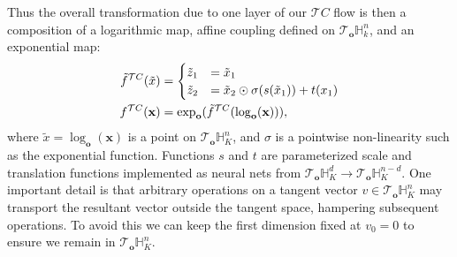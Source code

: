 Thus the overall transformation due to one layer of our $\mathcal{T}C$ flow is then a composition of a logarithmic map, affine coupling defined on $\mathcal{T}_{\textbf{o}}\mathbb{H}^n_k$, and an exponential map:
\begin{align}
    \label{eq:tangent_coupling}
     \tilde{f}^{\mathcal{T}C}(\tilde{x}) &=
     \begin{cases}
     \tilde{z}_{1} &= \tilde{x}_{1} \\
     \tilde{z}_{2} &= \tilde{x}_{2} \odot \sigma(s(\tilde{x}_{1})) + t(x_1) \nonumber
     \end{cases}\\
    f^{\mathcal{T}C}(\mathbf{x}) &= \textnormal{exp}_{\textbf{o}}(\tilde{f}^{\mathcal{T}C}(\log_{\textbf{o}}(\textbf{x}))),
\end{align}
where $\tilde{x} = \log_{\textbf{o}}(\textbf{x})$ is a point on $\mathcal{T}_{\textbf{o}}\mathbb{H}^n_K$, and $\sigma$ is a pointwise non-linearity such as the exponential function. Functions $s$ and $t$ are parameterized scale and translation functions implemented as neural nets from $\mathcal{T}_{\textbf{o}}\mathbb{H}^{d}_K \to \mathcal{T}_{\textbf{o}}\mathbb{H}^{n-d}_K$.
One important detail is that arbitrary operations on a tangent vector $v \in \mathcal{T}_{\textbf{o}}\mathbb{H}^n_K$ may transport the resultant vector outside the tangent space, hampering subsequent operations.
To avoid this we can keep the first dimension fixed at $v_0 = 0$ to ensure we remain in $\mathcal{T}_{\textbf{o}}\mathbb{H}^{n}_K$.

